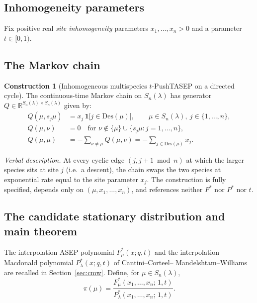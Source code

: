 \documentclass[12pt]{article}
\theoremstyle{definition}
\newtheorem{construction}[theorem]{Construction}
\begin{document}
\subsection{Inhomogeneity parameters}

Fix positive real \emph{site inhomogeneity} parameters
$x_1,\dots,x_n>0$ and a parameter $t\in[0,1)$.

\subsection{The Markov chain}

\begin{construction}[Inhomogeneous multispecies $t$-PushTASEP on a
directed cycle]\label{constr:tpush}
The continuous-time Markov chain on $S_n(\lambda)$ has generator
$Q\in\mathbb{R}^{S_n(\lambda)\times S_n(\lambda)}$ given by:
\begin{align}
Q(\mu,s_j\mu)&=x_j\,\mathbf{1}\bigl[j\in\mathrm{Des}(\mu)\bigr],
\qquad\mu\in S_n(\lambda),\ j\in\{1,\dots,n\}, \label{eq:rate}\\[2pt]
Q(\mu,\nu)&=0\quad\text{for }\nu\notin\{\mu\}\cup\{s_j\mu:j=1,\dots,n\},
\label{eq:zero}\\[2pt]
Q(\mu,\mu)&=-\!\sum_{\nu\neq\mu}\!Q(\mu,\nu)
=-\!\sum_{j\in\mathrm{Des}(\mu)}\!x_j. \label{eq:diag}
\end{align}
\end{construction}

\noindent\emph{Verbal description.} At every cyclic edge
$(j,j+1\bmod n)$ at which the larger species sits at site $j$ (i.e.\ a
descent), the chain swaps the two species at exponential rate equal to
the site parameter $x_j$. The construction is fully specified, depends
only on $(\mu,x_1,\dots,x_n)$, and references neither $F^*$ nor $P^*$
nor $t$.

\subsection{The candidate stationary distribution and main theorem}

The interpolation ASEP polynomial $F^*_\mu(x;q,t)$ and the interpolation
Macdonald polynomial $P^*_\lambda(x;q,t)$ of Cantini--Corteel--%
Mandelshtam--Williams~\cite{CMW} are recalled in Section~\ref{sec:cmw}.
Define, for $\mu\in S_n(\lambda)$,
\begin{equation}\label{eq:pi}
\pi(\mu)=\frac{F^*_\mu(x_1,\dots,x_n;\,1,t)}
{P^*_\lambda(x_1,\dots,x_n;\,1,t)}.
\end{equation}
\end{document}
